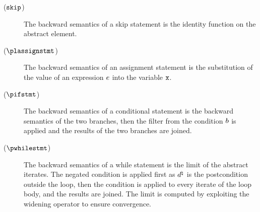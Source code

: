 \begin{description}
  \item[\normalfont ($\textup{\texttt{skip}}$)] The backward semantics of a skip statement is the identity function on the abstract element.
  \item[\normalfont ($\plassignstmt$)] The backward semantics of an assignment statement is the substitution of the value of an expression $e$ into the variable $\textup{\texttt{x}}$.
  \item[\normalfont ($\pifstmt$)] The backward semantics of a conditional statement is the backward semantics of the two branches, then the filter from the condition $b$ is applied and the results of the two branches are joined.
  \item[\normalfont ($\pwhilestmt$)] The backward semantics of a while statement is the limit of the abstract iterates. The negated condition is applied first as $d^\natural$ is the postcondition outside the loop, then the condition is applied to every iterate of the loop body, and the results are joined. The limit is computed by exploiting the widening operator to ensure convergence.


\end{description}
